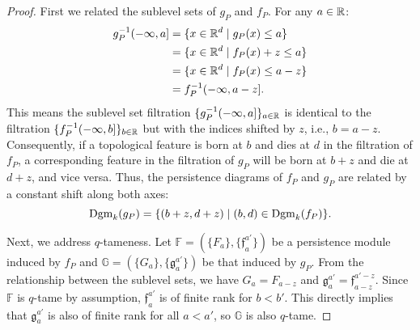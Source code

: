 \begin{proof}
    First we related the sublevel sets of $g_P$ and $f_P$.
    For any $a \in \mathbb{R}$:
    \begin{align}
        g^{-1}_P(-\infty, a] &= \{x \in \mathbb{R}^d \mid g_P(x) \leq a\} \\
        &= \{x \in \mathbb{R}^d \mid f_P(x) + z \leq a\} \\
        &= \{x \in \mathbb{R}^d \mid f_P(x) \leq a - z\} \\
        &= f^{-1}_P(-\infty, a - z].
    \end{align}
    This means the sublevel set filtration $\{g_P^{-1}(-\infty, a]\}_{a\in \mathbb{R}}$
    is identical to the filtration $\{f_P^{-1}(-\infty, b]\}_{b\in \mathbb{R}}$ but
    with the indices shifted by $z$, i.e., $b = a - z$.
    Consequently, if a topological feature is born at $b$ and dies at $d$ in
    the filtration of $f_P$, a corresponding feature in the filtration of $g_P$
    will be born at $b + z$ and die at $d + z$, and vice versa.
    Thus, the persistence diagrams of $f_P$ and $g_P$ are related by a constant
    shift along both axes:
    \begin{equation}
        \operatorname{Dgm}_k(g_P) = \{(b + z, d + z) \mid (b, d) \in \operatorname{Dgm}_k(f_P)\}.
    \end{equation}
    
    Next, we address $q$-tameness.
    Let $\mathbb{F} = (\{F_a\}, \{\mathfrak{f}_a^{a'}\})$ be a persistence
    module induced by $f_P$ and
    $\mathbb{G} = (\{G_a\}, \{\mathfrak{g}_a^{a'}\})$ be that induced by $g_P$.
    From the relationship between the sublevel sets, we have
    $G_a = F_{a - z}$ and $\mathfrak{g}_a^{a'} = \mathfrak{f}_{a - z}^{a' - z}$.
    Since $\mathbb{F}$ is $q$-tame by assumption, $\mathfrak{f}_a^{a'}$ is of
    finite rank for $b < b'$.
    This directly implies that $\mathfrak{g}_a^{a'}$ is also of finite rank for
    all $a < a'$, so $\mathbb{G}$ is also $q$-tame.
    

\end{proof}
